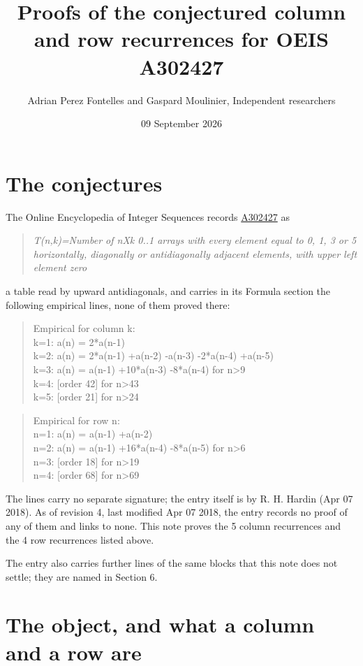 \documentclass[11pt]{article}
\title{Proofs of the conjectured column and row recurrences for OEIS A302427}
\author{Adrian Perez Fontelles and Gaspard Moulinier, Independent researchers}
\date{09 September 2026}
\theoremstyle{definition}
\begin{document}
\maketitle
\section{The conjectures}

The Online Encyclopedia of Integer Sequences records \href{https://oeis.org/A302427}{A302427} as

\begin{quote}\itshape T(n,k)=Number of nXk 0..1 arrays with every element equal to 0, 1, 3 or 5 horizontally, diagonally or antidiagonally adjacent elements, with upper left element zero\end{quote}

a table read by upward antidiagonals, and carries in its Formula section the following empirical lines, none of them proved there:

\begin{quote}\ttfamily Empirical for column k:\\
k=1: a(n) = 2*a(n-1)\\k=2: a(n) = 2*a(n-1) +a(n-2) -a(n-3) -2*a(n-4) +a(n-5)\\k=3: a(n) = a(n-1) +10*a(n-3) -8*a(n-4) for n>9\\k=4: [order 42] for n>43\\k=5: [order 21] for n>24\end{quote}

\begin{quote}\ttfamily Empirical for row n:\\
n=1: a(n) = a(n-1) +a(n-2)\\n=2: a(n) = a(n-1) +16*a(n-4) -8*a(n-5) for n>6\\n=3: [order 18] for n>19\\n=4: [order 68] for n>69\end{quote}

The lines carry no separate signature; the entry itself is by R. H. Hardin (Apr 07 2018). As of revision 4, last modified Apr 07 2018, the entry records no proof of any of them and links to none. This note proves the 5 column recurrences and the 4 row recurrences listed above.

The entry also carries further lines of the same blocks that this note does not settle; they are named in Section 6.

\section{The object, and what a column and a row are}
\end{document}

